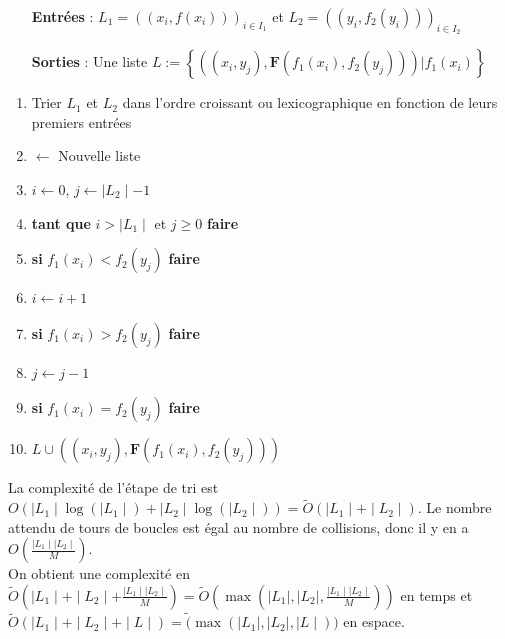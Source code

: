 \documentclass[12pt,openany]{report}
\begin{document}
\begin{itemize}
\item[\textbf{Entrées}]: $ L_1=((x_i,f(x_i)))_{i \in I_1} $ et $  L_2=((y_i,f_2(y_i)))_{i \in I_2}  $
\item[\textbf{Sorties}]: Une liste $L:=\left\lbrace ((x_i,y_j),\mathbf{F}(f_1(x_i),f_2(y_j)))| f_1(x_i) \right\rbrace     $
\end{itemize}
\begin{enumerate}
\item Trier $L_1$ et $L_2$ dans l’ordre croissant ou lexicographique en fonction de leurs premiers entrées
\item $\gets $ Nouvelle liste
\item $ i \gets 0  $, $j \gets \mid L_2\mid -1 $
\item \textbf{tant que} \hspace{0.3cm} $i> \mid L_1 \mid   $ et $ j\geq 0  $ \hspace{0.3cm}  \textbf{faire}
\item \hspace{0.5cm} \textbf{si} \hspace{0.3cm} $ f_1(x_i)< f_2(y_j) $ \hspace{0.3cm} \textbf{faire}

\item \hspace{0.5cm} $ i \gets i+1 $
\item \hspace{0.5cm} \textbf{si} \hspace{0.3cm} $ f_1(x_i)> f_2(y_j) $ \hspace{0.3cm} \textbf{faire}

\item \hspace{0.5cm} $ j \gets j -1 $
\item \hspace{0.5cm} \textbf{si} \hspace{0.3cm} $ f_1(x_i)= f_2(y_j) $ \hspace{0.3cm} \textbf{faire}

\item \hspace{0.5cm} $ L \cup ((x_i,y_j),\mathbf{F}(f_1(x_i),f_2(y_j))) $

\end{enumerate}
La complexité de l'étape de tri est $O(\mid L_1 \mid \log(\mid L_1 \mid)+ \mid L_2 \mid \log(\mid L_2 \mid))=\tilde{O}(\mid L_1 \mid + \mid L_2 \mid)  $.
Le nombre attendu de tours de boucles est égal au nombre de collisions,
donc il y en a $O(\frac{\mid L_1\mid \mid L_2 \mid}{M}) $.\\
On obtient une complexité en $ \tilde{O}(\mid L_1\mid + \mid L_2 \mid+ \frac{\mid L_1\mid\mid L_2 \mid }{M})=\tilde{O}(\max(\mid L_1 \mid,\mid L_2 \mid,\frac{\mid L_1\mid\mid L_2 \mid }{M} )) $ en temps et $\tilde{O}(\mid L_1\mid + \mid L_2 \mid +\mid L \mid) = \tilde(\max(\mid L_1\mid,\mid L_2 \mid,\mid L \mid))$ en espace.
\end{document}
